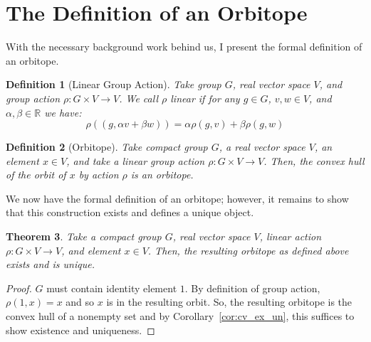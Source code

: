 \documentclass[12]{amsart}
\newtheorem{theorem}{Theorem}[section]
\newtheorem{definition}[theorem]{Definition}
\newcommand{\R}[0]{\mathbb{R}}
\begin{document}
\section{The Definition of an Orbitope}
\label{sec:definition}
With the necessary background work behind us, I present the formal definition of an orbitope.
\begin{definition}[Linear Group Action]
    Take group $G$, real vector space $V$, and group action $\rho: G \times V \to V$. We call $\rho$ \emph{linear} if for any $g \in G$, $v,w \in V$, and $\alpha, \beta \in \R$ we have:
    \begin{equation*}
        \rho((g,\alpha v + \beta w)) = \alpha\rho(g,v)+\beta\rho(g,w)
    \end{equation*}
    \label{def:linear_action}
\end{definition}
\begin{definition}[Orbitope]
    Take compact group $G$, a real vector space $V$, an element $x \in V$, and take a linear group action $\rho: G \times V \to V$. 
    Then, the convex hull of the orbit of $x$ by action $\rho$ is an orbitope.
\end{definition}

We now have the formal definition of an orbitope; however, it remains to show that this construction exists and defines a unique object.
\begin{theorem}
    Take a compact group $G$, real vector space $V$, linear action $\rho: G \times V \to V$, and element $x \in V$. Then, the resulting orbitope as defined above exists and is unique.
\end{theorem}
\begin{proof}
    $G$ must contain identity element $1$. By definition of group action, $\rho(1,x) = x$ and so $x$ is in the resulting orbit. So, the resulting orbitope is the convex hull of a nonempty set and by Corollary~\ref{cor:cv_ex_un}, this suffices to show existence and uniqueness.
\end{proof}
\end{document}
